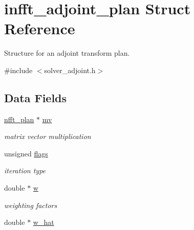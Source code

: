 \hypertarget{structinfft__adjoint__plan}{\section{infft\-\_\-adjoint\-\_\-plan Struct Reference}
\label{structinfft__adjoint__plan}
}


Structure for an adjoint transform plan.  




{\ttfamily \#include $<$solver\-\_\-adjoint.\-h$>$}

\subsection*{Data Fields}
\begin{DoxyCompactItemize}
\item 
\hypertarget{structinfft__adjoint__plan_a320424336d0f74f0d24cc67053dea7ca}{\hyperlink{structnfft__plan}{nfft\-\_\-plan} $\ast$ \hyperlink{structinfft__adjoint__plan_a320424336d0f74f0d24cc67053dea7ca}{mv}}\label{structinfft__adjoint__plan_a320424336d0f74f0d24cc67053dea7ca}

\begin{DoxyCompactList}\small\item\em matrix vector multiplication \end{DoxyCompactList}\item 
\hypertarget{structinfft__adjoint__plan_a83f3fc443fbf5c40336a46a8c1bdfaf8}{unsigned \hyperlink{structinfft__adjoint__plan_a83f3fc443fbf5c40336a46a8c1bdfaf8}{flags}}\label{structinfft__adjoint__plan_a83f3fc443fbf5c40336a46a8c1bdfaf8}

\begin{DoxyCompactList}\small\item\em iteration type \end{DoxyCompactList}\item 
\hypertarget{structinfft__adjoint__plan_a67fabb54885946acaaad95a5a472b004}{double $\ast$ \hyperlink{structinfft__adjoint__plan_a67fabb54885946acaaad95a5a472b004}{w}}\label{structinfft__adjoint__plan_a67fabb54885946acaaad95a5a472b004}

\begin{DoxyCompactList}\small\item\em weighting factors \end{DoxyCompactList}\item 
\hypertarget{structinfft__adjoint__plan_a76ad0c6eace967391553fd4939e70662}{double $\ast$ \hyperlink{structinfft__adjoint__plan_a76ad0c6eace967391553fd4939e70662}{w\-\_\-hat}}\label{structinfft__adjoint__plan_a76ad0c6eace967391553fd4939e70662}


\end{DoxyCompactItemize}
